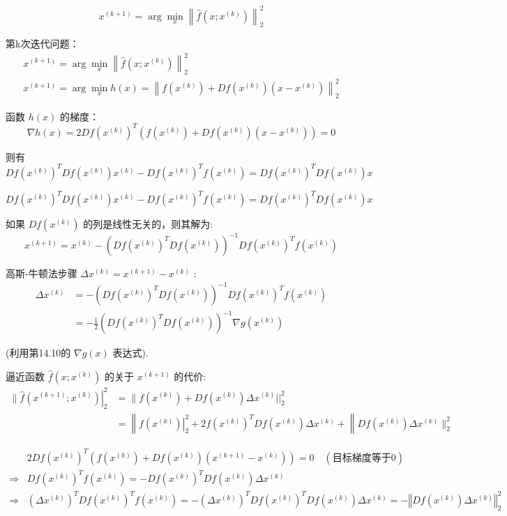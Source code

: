 $$
x^{(k+1)}=\arg \min _{x}\left\|\hat{f}\left(x ; x^{(k)}\right)\right\|_{2}^{2}
$$

第k次迭代问题：
$$
\begin{array}{c}
x^{(k+1)}=\arg \min _{x}\left\|\hat{f}\left(x ; x^{(k)}\right)\right\|_{2}^{2} \\
x^{(k+1)}=\arg \min _{x} h(x)=\left\|f\left(x^{(k)}\right)+D f\left(x^{(k)}\right)\left(x-x^{(k)}\right)\right\|_{2}^{2}
\end{array}
$$

函数 $ h(x) $ 的梯度：
$$
\nabla h(x)=2 D f\left(x^{(k)}\right)^{T}\left(f\left(x^{(k)}\right)+D f\left(x^{(k)}\right)\left(x-x^{(k)}\right)\right)=0
$$

则有
$$ D f\left(x^{(k)}\right)^{T} D f\left(x^{(k)}\right) x^{(k)}-D f\left(x^{(k)}\right)^{T} f\left(x^{(k)}\right)=D f\left(x^{(k)}\right)^{T} D f\left(x^{(k)}\right) x $$

$$ D f\left(x^{(k)}\right)^{T} D f\left(x^{(k)}\right) x^{(k)}-D f\left(x^{(k)}\right)^{T} f\left(x^{(k)}\right)=D f\left(x^{(k)}\right)^{T} D f\left(x^{(k)}\right) x $$

如果 $ D f\left(x^{(k)}\right) $ 的列是线性无关的，则其解为:
$$
x^{(k+1)}=x^{(k)}-\left(D f\left(x^{(k)}\right)^{T} D f\left(x^{(k)}\right)\right)^{-1} D f\left(x^{(k)}\right)^{T} f\left(x^{(k)}\right)
$$

高斯-牛顿法步骤 $ \Delta x^{(k)}=x^{(k+1)}-x^{(k)} $ :
$$
\begin{aligned}
\Delta x^{(k)} &=-\left(D f\left(x^{(k)}\right)^{T} D f\left(x^{(k)}\right)\right)^{-1} D f\left(x^{(k)}\right)^{T} f\left(x^{(k)}\right) \\
&=-\frac{1}{2}\left(D f\left(x^{(k)}\right)^{T} D f\left(x^{(k)}\right)\right)^{-1} \nabla g\left(x^{(k)}\right)
\end{aligned}
$$

(利用第14.10的 $ \nabla g(x) $ 表达式).

逼近函数 $ \hat{f}\left(x ; x^{(k)}\right) $ 的关于 $ x^{(k+1)} $ 的代价:
$$
\begin{aligned}
\|\left.\hat{f}\left(x^{(k+1)} ; x^{(k)}\right)\right|_{2} ^{2} &=\| f\left(x^{(k)}\right)+D f\left(x^{(k)}\right) \Delta x^{(k)}||_{2}^{2} \\
&=\left\|\left.f\left(x^{(k)}\right)\right|_{2} ^{2}+2 f\left(x^{(k)}\right)^{T} D f\left(x^{(k)}\right) \Delta x^{(k)}+\right\| D f\left(x^{(k)}\right) \Delta x^{(k)} \|_{2}^{2}
\end{aligned}
$$

$$\begin{aligned}
    & 2Df\left( x^{(k)}\right)^{T}\left( f\left( x^{(k)}\right) +Df\left( x^{(k)}\right)\left( x^{(k+1)} -x^{(k)}\right)\right) =0\quad ( 目标梯度等于0)\\
   \Rightarrow  & Df\left( x^{(k)}\right)^{T} f\left( x^{(k)}\right) =-Df\left( x^{(k)}\right)^{T} Df\left( x^{(k)}\right) \Delta x^{(k)}\\
   \Rightarrow  & \left( \Delta x^{(k)}\right)^{T} Df\left( x^{(k)}\right)^{T} f\left( x^{(k)}\right) =-\left( \Delta x^{(k)}\right)^{T} Df\left( x^{(k)}\right)^{T} Df\left( x^{(k)}\right) \Delta x^{(k)} =-\left\Vert Df\left( x^{(k)}\right) \Delta x^{(k)}\right\Vert _{2}^{2}
   \end{aligned}$$


